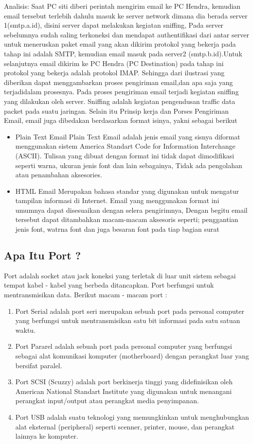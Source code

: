 \begin{enumerate}
Analisis: Saat PC siti diberi perintah mengirim email ke PC Hendra, kemudian email tersebut terlebih dahulu masuk ke server network dimana dia berada server 1(smtp.a.id), disini server dapat melakukan kegiatan sniffing, Pada server sebelumnya sudah saling terkoneksi dan mendapat authentifikasi dari antar server untuk meneruskan paket email yang akan dikirim protokol yang bekerja pada tahap ini adalah SMTP, kemudian email masuk pada server2 (smtp.b.id).Untuk selanjutnya email dikirim ke PC Hendra (PC Destination) pada tahap ini protokol yang bekerja adalah protokol IMAP. Sehingga dari ilustrasi yang diberikan dapat menggambarkan proses pengiriman email,dan apa saja yang terjadidalam prosesnya. 
Pada proses pengiriman email terjadi kegiatan sniffing yang dilakukan oleh server. Sniffing adalah kegiatan pengendusan traffic data packet pada suatu jaringan. 
Selain itu Prinsip kerja dan Porses Pengiriman Email, email juga dibedakan berdasarkan format isinya, yakni sebagai berikut
\begin{itemize} 
\item Plain Text Email Plain Text Email adalah jenis email yang sisnya diformat menggunakan sistem America Standart Code for Information Interchange (ASCII). Tulisan yang dibuat dengan format ini tidak dapat dimodifikasi seperti warna, ukuran jenis font dan lain sebagainya, Tidak ada pengolahan atau penambahan aksesories. 
\item HTML Email Merupakan bahasa standar yang digunakan untuk mengatur tampilan informasi di Internet. Email yang menggunakan format ini umumnya dapat disesuaikan dengan selera pengirimnya, Dengan begitu email tersebut dapat ditambahkan macam-macam aksesoris seperti; penggantian jenis font, watrna font dan juga besaran font pada tiap bagian surat\end{itemize}
\subsection {Apa Itu Port ?} 
Port adalah socket atau jack koneksi yang terletak di luar unit sistem sebagai tempat kabel - kabel yang berbeda ditancapkan. Port berfungsi untuk mentransmisikan data. Berikut macam - macam port : 
\begin{enumerate}
\item Port Serial adalah port seri merupakan sebuah port pada personal computer yang berfungsi untuk mentransmisikan satu bit informasi pada satu satuan waktu. 
\item Port Pararel adalah sebuah port pada personal computer yang berfungsi sebagai alat komunikasi komputer (motherboard) dengan perangkat luar yang bersifat paralel. 
\item Port SCSI (Scuzzy) adalah port berkinerja tinggi yang didefinisikan oleh American National Standart Institute yang digunakan untuk menangani perangkat input/output atau perangkat media penyimpanan. 
\item Port USB adalah suatu teknologi yang memungkinkan untuk menghubungkan alat eksternal (peripheral) seperti scenner, printer, mouse, dan perangkat lainnya ke komputer. \par
\end{enumerate}

\end{enumerate}
